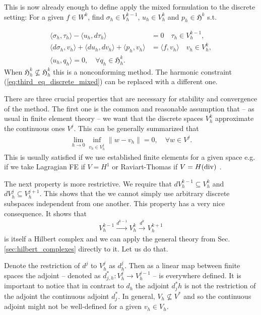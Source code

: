 \documentclass[../master_thesis.tex]{subfiles}
\begin{document}
This is now already enough to define apply the mixed formulation to the discrete setting: 
For a given $f \in W^k$, find $\sigma_h \in V_h^{k-1}$, $u_h \in V_h^k$ and 
$p_h \in \mathfrak{H}^k$ s.t.

\begin{align}
    \langle \sigma_h, \tau_h \rangle - \langle u_h, d\tau_h \rangle &= 0 \quad \tau_h \in V_h^{k-1},
    \\ \langle d\sigma_h, v_h \rangle + \langle du_h, dv_h \rangle + \langle p_h, v_h \rangle 
        &= \langle f, v_h \rangle \quad v_h \in V_h^k,
    \\ \langle u_h, q_h \rangle = 0, \quad \forall q_h \in \mathfrak{H}^k_h \label{eq:third_eq_discrete_mixed}.
\end{align}
When $\mathfrak{H}_h^k \not\subseteq \mathfrak{H}^k_h$ this is a nonconforming
method. The harmonic constraint (\ref{eq:third_eq_discrete_mixed}) can 
be replaced with a different one.

There are three crucial properties that are necessary for stability and convergence 
of the method. The first one is the common and reasonable assumption that 
-- as usual in finite element theory -- we want that the discrete spaces $V_h^k$
approximate the continuous ones $V^j$. This can be generally summarized that 
\begin{align*}
    \lim_{h \rightarrow 0} \inf_{v_h \in V_h^j} \lVert w - v_h \rVert = 0, \quad \forall w \in V^j.
\end{align*}
This is usually satisfied if we use established finite elements for a given space 
e.g. if we take Lagragian FE if $V = H^1$ or Raviart-Thomas if $V=H(\operatorname{div})$ \cite{}.

The next property is more restrictive. We require that $dV_h^{k-1} \subseteq V_h^k$ 
and $dV_h^j \subseteq V_h^{j+1}$. This shows that the we cannot simply use arbitrary 
discrete subspaces independent from one another. This property has a very nice
consequence. 
It shows that 
\begin{align*}
    V_h^{k-1} \xrightarrow{d^{k-1}} V_h^k \xrightarrow{d^k} V_h^{k+1}
\end{align*}
is itself a Hilbert complex and we can apply the general theory from 
Sec. \ref{sec:hilbert_complexes} directly to it. Let us do that.

Denote the restriction of $d^j$ to $V_h^j$ as $d_h^j$. Then as a linear map 
between finite spaces the adjoint -- denoted as $d_{j,h}^*: V_h^j \rightarrow V_h^{j-1}$ -- 
is everywhere defined. It is important to notice that in contrast to $d_h$ 
the adjoint $d^*_jh$ is not the restriction of the adjoint the continuous adjoint $d^*_j$.
In general, $V_h \not\subseteq V^*$ and so the continuous adjoint might not be 
well-defined for a given $v_h \in V_h$. 
\end{document}
